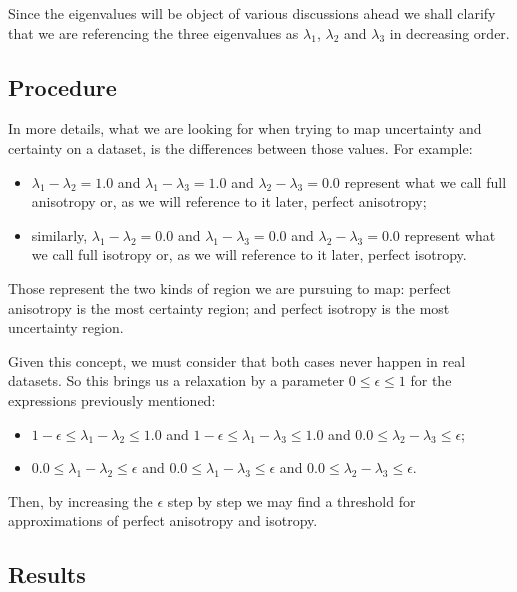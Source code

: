 \documentclass[a4paper,11pt]{report}
\begin{document}
    Since the eigenvalues will be object of various discussions ahead we shall clarify that we are referencing the three eigenvalues as $\lambda_1$, $\lambda_2$ and $\lambda_3$ in decreasing order.

    \subsection{Procedure}
    In more details, what we are looking for when trying to map uncertainty and certainty on a dataset, is the differences between those values. For example:

    \begin{itemize}
      \item $\lambda_1 - \lambda_2 = 1.0$ and $\lambda_1 - \lambda_3 = 1.0$ and $\lambda_2 - \lambda_3 = 0.0$ represent what we call full anisotropy or, as we will reference to it later, perfect anisotropy;
      \item similarly, $\lambda_1 - \lambda_2 = 0.0$ and $\lambda_1 - \lambda_3 = 0.0$ and $\lambda_2 - \lambda_3 = 0.0$ represent what we call full isotropy or, as we will reference to it later, perfect isotropy.
    \end{itemize}

    Those represent the two kinds of region we are pursuing to map: perfect anisotropy is the most certainty region; and perfect isotropy is the most uncertainty region.

    Given this concept, we must consider that both cases never happen in real datasets. So this brings us a relaxation by a parameter $0 \leq \epsilon \leq 1$ for the expressions previously mentioned:

    \newpage
    \begin{itemize}
      \item $1 - \epsilon \leq \lambda_1 - \lambda_2 \leq 1.0$ and $1 - \epsilon \leq \lambda_1 - \lambda_3 \leq 1.0$ and $0.0 \leq \lambda_2 - \lambda_3 \leq \epsilon$;
      \item $0.0 \leq \lambda_1 - \lambda_2 \leq \epsilon$ and $0.0 \leq \lambda_1 - \lambda_3 \leq \epsilon$ and $0.0 \leq \lambda_2 - \lambda_3 \leq \epsilon$.
    \end{itemize}

    Then, by increasing the $\epsilon$ step by step we may find a threshold for approximations of perfect anisotropy and isotropy.

    \subsection{Results}
\end{document}
